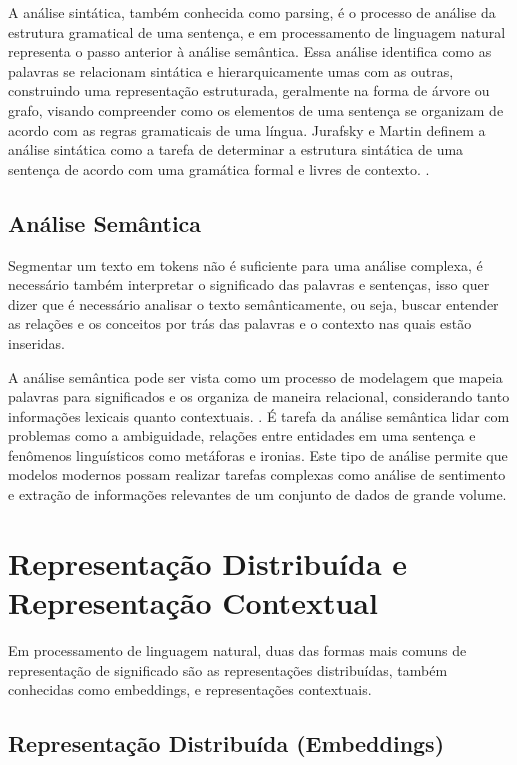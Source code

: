 A análise sintática, também conhecida como parsing, é o processo de análise da estrutura gramatical de uma sentença, e em processamento de linguagem natural representa o passo anterior à análise semântica. Essa análise identifica como as palavras se relacionam sintática e hierarquicamente umas com as outras, construindo uma representação estruturada, geralmente na forma de árvore ou grafo, visando compreender como os elementos de uma sentença se organizam de acordo com as regras gramaticais de uma língua. Jurafsky e Martin definem a análise sintática como a tarefa de determinar a estrutura sintática de uma sentença de acordo com uma gramática formal e livres de contexto. \cite{JurafskyMartin2023}.

\subsection{Análise Semântica}\label{subsec:nlp3}

Segmentar um texto em tokens não é suficiente para uma análise complexa, é necessário também interpretar o significado das palavras e sentenças, isso quer dizer que é necessário analisar o texto semânticamente, ou seja, buscar entender as relações e os conceitos por trás das palavras e o contexto nas quais estão inseridas.

A análise semântica pode ser vista como um processo de modelagem que mapeia palavras para significados e os organiza de maneira relacional, considerando tanto informações lexicais quanto contextuais. \cite{JurafskyMartin2023}. É tarefa da análise semântica lidar com problemas como a ambiguidade, relações entre entidades em uma sentença e fenômenos linguísticos como metáforas e ironias. Este tipo de análise permite que modelos modernos possam realizar tarefas complexas como análise de sentimento e extração de informações relevantes de um conjunto de dados de grande volume.

\section{Representação Distribuída e Representação Contextual}\label{subsec:embeddings_transformers}

Em processamento de linguagem natural, duas das formas mais comuns de representação de significado são as representações distribuídas, também conhecidas como embeddings, e representações contextuais. 

\subsection{Representação Distribuída (Embeddings)}\label{subsec:embeddings}

